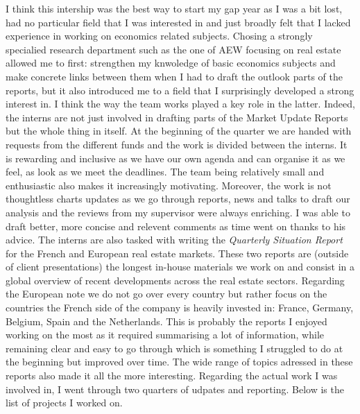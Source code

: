 I think this intership was the best way to start my gap year as I was a bit lost, had no particular field that I was interested in and just broadly felt that I lacked experience in working on economics related subjects. 
Chosing a strongly specialied research department such as the one of AEW focusing on real estate allowed me to first: strengthen my knwoledge of basic economics subjects and make concrete links between them when I had to draft the outlook parts of the reports, but it also introduced me to a field that I surprisingly developed a strong interest in. 
I think the way the team works played a key role in the latter. 
Indeed, the interns are not just involved in drafting parts of the Market Update Reports but the whole thing in itself. 
At the beginning of the quarter we are handed with requests from the different funds and the work is divided between the interns. 
It is rewarding and inclusive as we have our own agenda and can organise it as we feel, as look as we meet the deadlines. 
The team being relatively small and enthusiastic also makes it increasingly motivating. 
Moreover, the work is not thoughtless charts updates as we go through reports, news and talks to draft our analysis and the reviews from my supervisor were always enriching. 
I was able to draft better, more concise and relevent comments as time went on thanks to his advice. 
The interns are also tasked with writing the \textit{Quarterly Situation Report} for the French and European real estate markets. 
These two reports are (outside of client presentations) the longest in-house materials we work on and consist in a global overview of recent developments across the real estate sectors. 
Regarding the European note we do not go over every country but rather focus on the countries the French side of the company is heavily invested in: France, Germany, Belgium, Spain and the Netherlands. 
This is probably the reports I enjoyed working on the most as it required summarising a lot of information, while remaining clear and easy to go through which is something I struggled to do at the beginning but improved over time. 
The wide range of topics adressed in these reports also made it all the more interesting. 
Regarding the actual work I was involved in, I went through two quarters of udpates and reporting. Below is the list of projects I worked on.


